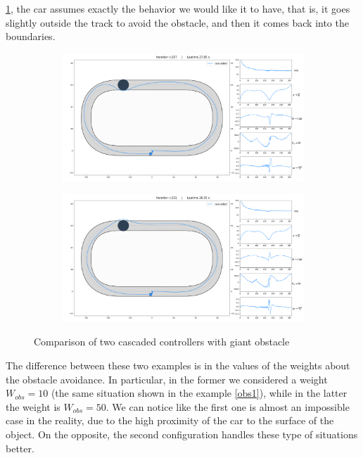 \documentclass[a4paper, onecolumn, 11pt]{article}
\begin{document}
\ref{giant2}, the car assumes exactly the behavior we would like it to have, that is, 
it goes slightly outside the track to avoid the obstacle, and then it comes back into 
the boundaries. 
\begin{figure}[H]
    \centering
    \begin{subfigure}{0.9\textwidth}
        \centering
        \includegraphics[width=\textwidth]{assets/giant2.png}
        \label{giant2}
    \end{subfigure}
    \begin{subfigure}{0.9\textwidth}
        \centering
        \includegraphics[width=\textwidth]{assets/giant1.png}
        \label{giant1}
    \end{subfigure}
    \caption[short]{Comparison of two cascaded controllers with giant obstacle}
\end{figure}
The difference between these two examples is in the values of the weights 
about the obstacle avoidance. In particular, in the former we considered a weight $W_{obs}=10$ 
(the same situation shown in the example \ref{obs1}), while in the latter the weight is
$W_{obs}=50$. We can notice like the first one is almost an impossible case in the reality,
due to the high proximity of the car to the surface of the object. On the opposite, the
second configuration handles these type of situations better.
\end{document}
